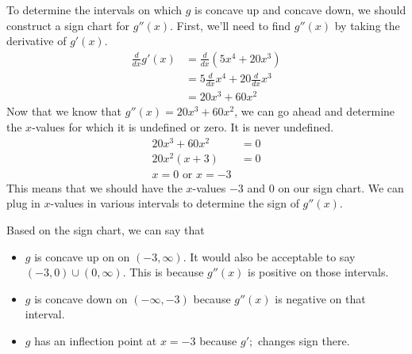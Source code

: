 \documentclass{article}
\begin{document}
\begin{enumerate}[resume]
\begin{enumerate}
    \begin{solution}
      To determine the intervals on which $g$ is concave up and concave down, we should
      construct a sign chart for $g''(x)$. First, we'll need to find $g''(x)$ by taking
      the derivative of $g'(x)$. 
      \begin{align*}
        \frac{d}{dx} g'(x) &= \frac{d}{dx} (5x^4 + 20x^3) \\
        &= 5\frac{d}{dx}x^4 + 20 \frac{d}{dx}x^3 \\
        &= 20x^3 + 60x^2
      \end{align*}
      Now that we know that $g''(x)=20x^3+60x^2$, we can go ahead and determine the
      $x$-values for which it is undefined or zero. It is never undefined.
      \begin{align*}
        20x^3 + 60x^2 &= 0 \\
        20x^2(x+3) &= 0 \\
        x = 0 \text{ or } x=-3
      \end{align*}
      This means that we should have the $x$-values $-3$ and $0$ on our sign chart. We can
      plug in $x$-values in various intervals to determine the sign of $g''(x)$.
      \begin{center}
      \end{center}

      Based on the sign chart, we can say that
      \begin{itemize}
          \item $g$ is concave up on on $(-3, \infty)$. It would also be acceptable to say
          $(-3, 0) \cup (0, \infty)$. This is because $g''(x)$ is positive on those intervals.
          \item $g$ is concave down on $(-\infty, -3)$ because $g''(x)$ is negative on that
          interval.
          \item $g$ has an inflection point at $x=-3$ because $g';$ changes sign there.
      \end{itemize}
      

\end{solution}
\end{enumerate}
\end{enumerate}
\end{document}
